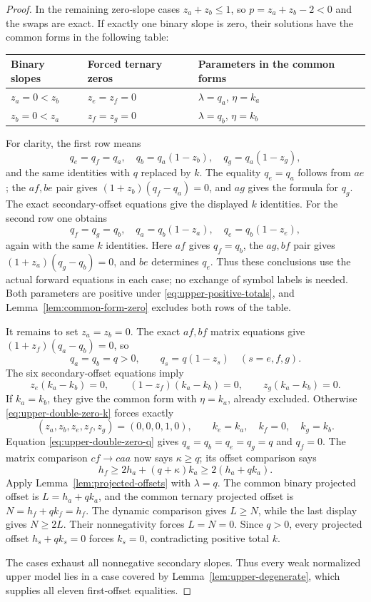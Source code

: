 \documentclass[11pt,a4paper]{article}
\begin{document}
\begin{proof}
In the remaining zero-slope cases $z_a+z_b\le1$, so
$p=z_a+z_b-2<0$ and the swaps are exact. If exactly one binary slope
is zero, their solutions have the common forms in the following table:
\begin{center}
\begin{tabular}{@{}lll@{}}
\toprule
Binary slopes & Forced ternary zeros & Parameters in the common forms\\
\midrule
$z_a=0<z_b$ & $z_e=z_f=0$ & $\lambda=q_a$, $\eta=k_a$\\
$z_b=0<z_a$ & $z_f=z_g=0$ & $\lambda=q_b$, $\eta=k_b$\\
\bottomrule
\end{tabular}
\end{center}
For clarity, the first row means
\[
q_e=q_f=q_a,\quad q_b=q_a(1-z_b),\quad q_g=q_a(1-z_g),
\]
and the same identities with $q$ replaced by $k$.
The equality $q_e=q_a$ follows from $ae$; the $af,be$ pair gives
$(1+z_b)(q_f-q_a)=0$, and $ag$ gives the formula for $q_g$.
The exact secondary-offset equations give the displayed $k$ identities.
For the second row one obtains
\[
q_f=q_g=q_b,\quad q_a=q_b(1-z_a),\quad q_e=q_b(1-z_e),
\]
again with the same $k$ identities. Here $af$ gives $q_f=q_b$, the
$ag,bf$ pair gives $(1+z_a)(q_g-q_b)=0$, and $be$ determines $q_e$.
Thus these conclusions use the actual forward equations in each case;
no exchange of symbol labels is needed. Both parameters are positive
under \eqref{eq:upper-positive-totals}, and
Lemma~\ref{lem:common-form-zero} excludes both rows of the table.

It remains to set $z_a=z_b=0$. The exact $af,bf$ matrix equations give
$(1+z_f)(q_a-q_b)=0$, so
\begin{equation}\label{eq:upper-double-zero-q}
q_a=q_b=q>0,\qquad q_s=q(1-z_s)\quad(s=e,f,g).
\end{equation}
The six secondary-offset equations imply
\begin{equation}\label{eq:upper-double-zero-k}
z_e(k_a-k_b)=0,\qquad
(1-z_f)(k_a-k_b)=0,\qquad
z_g(k_a-k_b)=0.
\end{equation}
If $k_a=k_b$, they give the common form with $\eta=k_a$, already
excluded. Otherwise \eqref{eq:upper-double-zero-k} forces exactly
\[
(z_a,z_b,z_e,z_f,z_g)=(0,0,0,1,0),\qquad
k_e=k_a,\quad k_f=0,\quad k_g=k_b.
\]
Equation \eqref{eq:upper-double-zero-q} gives
$q_a=q_b=q_e=q_g=q$ and $q_f=0$.
The matrix comparison $cf\to caa$ now says $\kappa\ge q$;
its offset comparison says
\[
h_f\ge2h_a+(q+\kappa)k_a\ge2(h_a+qk_a).
\]
Apply Lemma~\ref{lem:projected-offsets} with $\lambda=q$.
The common binary projected offset is $L=h_a+qk_a$, and the common
ternary projected offset is $N=h_f+qk_f=h_f$. The dynamic comparison
gives $L\ge N$, while the last display gives $N\ge2L$.
Their nonnegativity forces $L=N=0$. Since $q>0$, every projected
offset $h_s+qk_s=0$ forces $k_s=0$, contradicting positive total $k$.

The cases exhaust all nonnegative secondary slopes. Thus every weak
normalized upper model lies in a case covered by
Lemma~\ref{lem:upper-degenerate}, which supplies all eleven first-offset
equalities.
\end{proof}
\end{document}
